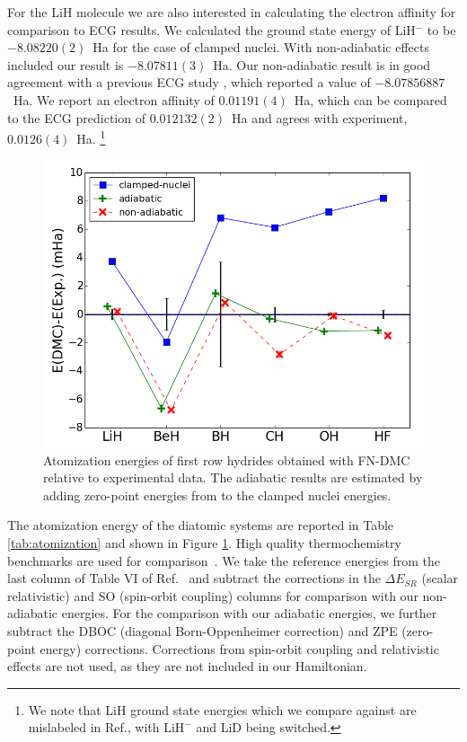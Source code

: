 \documentclass[pra,superscriptaddress,groupedaddress,twocolumn]{revtex4}
\begin{document}
For the LiH molecule we are also interested in calculating the electron affinity for comparison to ECG results. We calculated the ground state energy of LiH$^-$ to be $-8.08220(2)$~Ha for the case of clamped nuclei. With non-adiabatic effects included our result is  $-8.07811(3)$~Ha. Our non-adiabatic result is in good agreement with a previous ECG study \cite{Bubin_LiH_noBO}, which reported a value of $-8.07856887$~Ha. We report an electron affinity of $0.01191(4)$~Ha, which can be compared to the ECG prediction of $0.012132(2)$~Ha and agrees with experiment, $0.0126(4)$~Ha. \footnote{We note that LiH ground state energies which we compare against are mislabeled in Ref.\cite{Bubin_LiH_noBO}, with $\text{LiH}^-$ and LiD being switched.}

\begin{figure}[h]
\centering
\includegraphics[scale=.4]{Figures/atomization}
\caption{Atomization energies of first row hydrides obtained with FN-DMC relative to experimental data. The adiabatic results are estimated by adding zero-point energies from \cite{Feller_Corrections} to the clamped nuclei energies. \label{fig:atomization}}
\end{figure}

The atomization energy of the diatomic systems are reported in Table \ref{tab:atomization} and shown in Figure \ref{fig:atomization}. High quality thermochemistry benchmarks are used for comparison~\cite{Feller_Corrections}. We take the reference energies from the last column of Table VI of Ref.~\cite{Feller_Corrections} and subtract the corrections in the $\Delta E_{SR}$ (scalar relativistic) and SO (spin-orbit coupling) columns for comparison with our non-adiabatic energies. For the comparison with our adiabatic energies, we further subtract the DBOC (diagonal Born-Oppenheimer correction) and ZPE (zero-point energy) corrections. Corrections from spin-orbit coupling and relativistic effects are not used, as they are not included in our Hamiltonian. 
\end{document}
